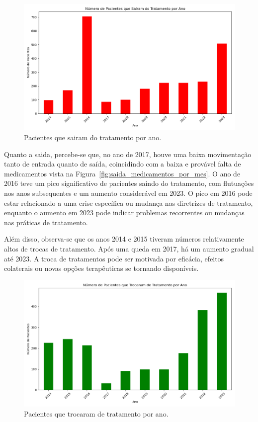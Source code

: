 \documentclass[article,a4paper,12pt,brazil,sumario=tradicional]{abntex2}
\begin{document}
\begin{figure}[!ht]
    \centering
    \includegraphics[width=1\textwidth]{pacientes_sairam_tratamento_por_ano.png}
    \caption{Pacientes que sairam do tratamento por ano.}
    \label{fig:pacientes_sairam_tratamento_por_ano}
\end{figure}

Quanto a saida, percebe-se que, no ano de 2017, houve uma baixa movimentação tanto de entrada quanto de saída, coincidindo com a baixa e provável falta de medicamentos vista na Figura~\ref{fig:saida_medicamentos_por_mes}. O ano de 2016 teve um pico significativo de pacientes saindo do tratamento, com flutuações nos anos subsequentes e um aumento considerável em 2023. O pico em 2016 pode estar relacionado a uma crise específica ou mudança nas diretrizes de tratamento, enquanto o aumento em 2023 pode indicar problemas recorrentes ou mudanças nas práticas de tratamento.

Além disso, observa-se que os anos 2014 e 2015 tiveram números relativamente altos de trocas de tratamento. Após uma queda em 2017, há um aumento gradual até 2023. A troca de tratamentos pode ser motivada por eficácia, efeitos colaterais ou novas opções terapêuticas se tornando disponíveis.

\begin{figure}[!ht]
    \centering
    \includegraphics[width=1\textwidth]{pacientes_troca_tratamento_por_ano.png}
    \caption{Pacientes que trocaram de tratamento por ano.}
    \label{fig:pacientes_troca_tratamento_por_ano}
\end{figure}
\end{document}
